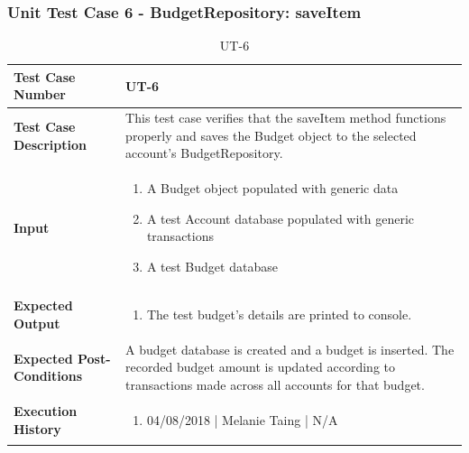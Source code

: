 \documentclass[12pt]{article}
\begin{document}
\subsubsection{Unit Test Case 6 - BudgetRepository: saveItem}
\def\arraystretch{1.5}%
\begin{table}[htbp]
\centering
\caption {UT-6}
\label{UT-6}
\begin{tabularx}{\textwidth}{ | l | X |}
\hline
\textbf{Test Case Number}      &  UT-6                         \\ \hline
\textbf{Test Case Description}    &  This test case verifies that the saveItem method functions properly and saves the Budget object to the selected account's BudgetRepository.         \\ \hline
\textbf{Input}         & 	\begin{enumerate}
	\item A Budget object populated with generic data
	\item A test Account database populated with generic transactions
	\item A test Budget database
\end{enumerate} \\ \hline

\textbf{Expected Output}     & \begin{enumerate}
	\item The test budget's details are printed to console.
\end{enumerate} \\ \hline
\textbf{Expected Post-Conditions}           & A budget database is created and a budget is inserted. The recorded budget amount is updated according to transactions made across all accounts for that budget.            \\ \hline
\textbf{Execution History}   &  \begin{enumerate}
	\item 04/08/2018 | Melanie Taing | N/A
\end {enumerate} \\ \hline
\end{tabularx}
\end{table}
\clearpage

\end{document}
